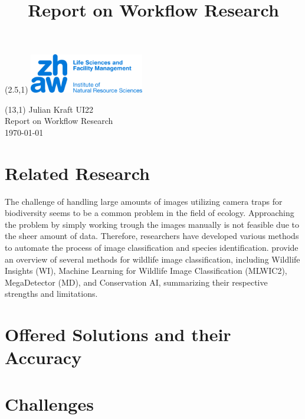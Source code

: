 \documentclass{article}
\title{Report on Workflow Research}
\makeatletter
\renewcommand{\maketitle}{
  \begin{flushleft} 
    \Large\textmd{\@title} 
    \par
  \end{flushleft}
}
\makeatother
\begin{document}
\begin{textblock}{5}(2.5,1) %
  \includegraphics[width=5cm]{logo.jpg} %
\end{textblock}

\begin{textblock}{6}(13,1) %
        \raggedleft
        Julian Kraft UI22\\
        Report on Workflow Research\\
        \today
\end{textblock}

\vspace*{1.5cm}


\maketitle


\section*{Related Research}

The challenge of handling large amounts of images utilizing camera traps for biodiversity seems to be a common problem in the field of ecology.
Approaching the problem by simply working trough the images manually is not feasible due to the sheer amount of data.
Therefore, researchers have developed various methods to automate the process of image classification and species identification.
\textcite{velezChoosingAppropriatePlatform2022} provide an overview of several methods for wildlife image classification, 
including Wildlife Insights (WI), Machine Learning for Wildlife Image Classification (MLWIC2), MegaDetector (MD), and Conservation AI, 
summarizing their respective strengths and limitations.




\section*{Offered Solutions and their Accuracy}


\section*{Challenges}
\end{document}
